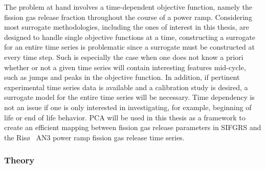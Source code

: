 The problem at hand involves a time-dependent objective function, namely the fission gas release fraction throughout the course of a power ramp. Considering most surrogate methodologies, including the ones of interest in this thesis, are designed to handle single objective functions at a time, constructing a surrogate for an entire time series is problematic since a surrogate must be constructed at every time step. Such is especially the case when one does not know a priori whether or not a given time series will contain interesting features mid-cycle, such as jumps and peaks in the objective function. In addition, if pertinent experimental time series data is available and a calibration study is desired, a surrogate model for the entire time series will be necessary. Time dependency is not an issue if one is only interested in investigating, for example, beginning of life or end of life behavior. \ac{PCA} will be used in this thesis as a framework to create an efficient mapping between fission gas release parameters in \ac{SIFGRS} and the Ris\o~ AN3 power ramp fission gas release time series. 

\subsubsection{Theory}
 
